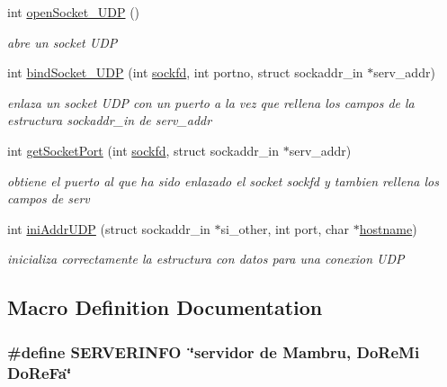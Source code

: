 \begin{DoxyCompactItemize}
int \hyperlink{_g-2301-05-_p1-socket_8h_abbf23148d1fb659c277f1c4cf3726f54}{open\-Socket\-\_\-\-U\-D\-P} ()
\begin{DoxyCompactList}\small\item\em abre un socket U\-D\-P \end{DoxyCompactList}\item 
int \hyperlink{_g-2301-05-_p1-socket_8h_aed488b731e5ab644507ef7acf6376f8b}{bind\-Socket\-\_\-\-U\-D\-P} (int \hyperlink{_g-2301-05-_p2-user_tools_8h_ad2c8fb3df3a737e0685e902870a611d2}{sockfd}, int portno, struct sockaddr\-\_\-in $\ast$serv\-\_\-addr)
\begin{DoxyCompactList}\small\item\em enlaza un socket U\-D\-P con un puerto a la vez que rellena los campos de la estructura sockaddr\-\_\-in de serv\-\_\-addr \end{DoxyCompactList}\item 
int \hyperlink{_g-2301-05-_p1-socket_8h_acf6e7bb836ff2442df28511544abf966}{get\-Socket\-Port} (int \hyperlink{_g-2301-05-_p2-user_tools_8h_ad2c8fb3df3a737e0685e902870a611d2}{sockfd}, struct sockaddr\-\_\-in $\ast$serv\-\_\-addr)
\begin{DoxyCompactList}\small\item\em obtiene el puerto al que ha sido enlazado el socket sockfd y tambien rellena los campos de serv \end{DoxyCompactList}\item 
int \hyperlink{_g-2301-05-_p1-socket_8h_aac80c67421f8d89f4d5614187dc9cb43}{ini\-Addr\-U\-D\-P} (struct sockaddr\-\_\-in $\ast$si\-\_\-other, int port, char $\ast$\hyperlink{servidor___i_r_c_8c_af203df082d5c6dcaa0c88b07cf86466d}{hostname})
\begin{DoxyCompactList}\small\item\em inicializa correctamente la estructura con datos para una conexion U\-D\-P \end{DoxyCompactList}\end{DoxyCompactItemize}


\subsection{Macro Definition Documentation}
\hypertarget{_g-2301-05-_p1-socket_8h_a6cd6cae86cd5361650f9672609970907}{
\subsubsection[{S\-E\-R\-V\-E\-R\-I\-N\-F\-O}]{\setlength{\rightskip}{0pt plus 5cm}\#define S\-E\-R\-V\-E\-R\-I\-N\-F\-O~\char`\"{}servidor de Mambru, Do\-Re\-Mi Do\-Re\-Fa\char`\"{}}}\label{_g-2301-05-_p1-socket_8h_a6cd6cae86cd5361650f9672609970907}


